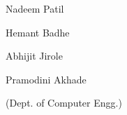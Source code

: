 \documentclass[12pt,a4paper]
{article}
\numberwithin{table}{section}
\begin{document}
\begin{normalsize}
{{%

	
}
				\vspace{0.9 in}
				
	\hspace{5 in}			Nadeem Patil
	
	\hspace{5 in}			Hemant Badhe
	
	\hspace{5 in}			Abhijit Jirole
	
	\hspace{5 in}			Pramodini Akhade
	
	
	\hspace{4.5 in}         (Dept. of Computer Engg.)
	
	
			
					
				

			}
		\end{normalsize}



\newpage
\pagestyle{plain}


				

\newpage
\pagestyle{fancy}
						
							
				\begin{normalsize}
				\pagestyle{plain}
              				
					\tableofcontents
			         
			         \newpage
			         \pagestyle{plain}
			         {\setlength{\baselineskip}{1.5\baselineskip}
                      	         
			         \listoffigures
			         }
			         

			         
 \newpage
 {\setlength{\baselineskip}{1.5\baselineskip}
\listoftables
{}
}			   
 \end{normalsize}
			         
\end{document}
